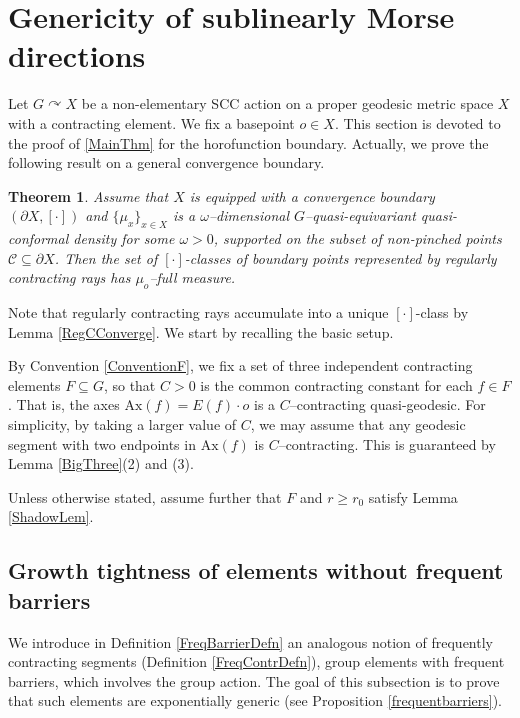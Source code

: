 \documentclass{amsart}
\newtheorem{thm}{Theorem}[section]
\theoremstyle{definition}
\theoremstyle{remark}
\newcommand{\act}{\curvearrowright}
\newcommand{\U}{ X}
\newcommand{\pU}{\partial{  X}}
\newcommand{\ax}{\mathrm{Ax}}
\newcommand{\pka}{\partial_\kappa}
\begin{document}

\section{Genericity of sublinearly Morse directions}\label{SecHTST}
Let $G\act \U$ be a non-elementary SCC action on a proper geodesic metric space $X$ with a contracting element. We fix a basepoint $o\in X$. This section is devoted to the proof of    \ref{MainThm} for the horofunction boundary. Actually, we prove the following   result on a general convergence boundary. 


\begin{thm}\label{HTSThm} 
Assume that $X$ is equipped with a convergence boundary $(\pU,[\cdot])$ and  $\{\mu_x\}_{x\in \U}$ is a $\omega$--dimensional $G$--quasi-equivariant quasi-conformal density  for some $\omega>0$, supported on the subset of non-pinched points $\mathcal C\subseteq \pU$.    Then the set of $[\cdot]$-classes of boundary points represented by regularly contracting rays has $\mu_o$--full measure.  
\end{thm} 

Note that regularly contracting rays accumulate into a unique $[\cdot]$-class by Lemma \ref{RegCConverge}. We start by recalling the basic setup.  

By Convention \ref{ConventionF}, we fix a set of three independent contracting elements $F\subseteq G$, so that  $C>0$ is the common contracting constant for each $f\in F$.  That is, the  axes $\ax( f)=E(f)\cdot o$ is a $C$--contracting quasi-geodesic.  For   simplicity, by taking a larger value of $C$, we may assume that  any geodesic segment with two endpoints in $\ax( f)$ is $C$--contracting. This is guaranteed by Lemma \ref{BigThree}(2) and (3).

Unless otherwise stated, assume further that $F$ and $r\ge r_0$ satisfy Lemma \ref{ShadowLem}.

\subsection{Growth tightness of elements without frequent barriers}
We introduce in Definition \ref{FreqBarrierDefn} an analogous notion of frequently contracting segments (Definition \ref{FreqContrDefn}), group elements with frequent barriers, which  involves the group action. The goal of this subsection is to prove that such elements are exponentially generic (see Proposition \ref{frequentbarriers}).
\end{document}
